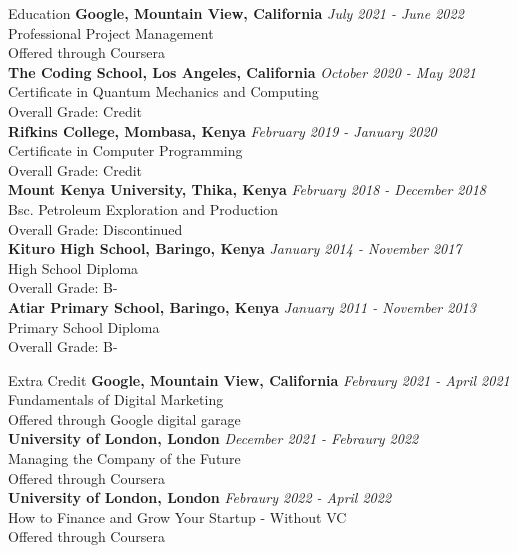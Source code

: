 \documentclass[
	11pt, %
]{resume} %
\begin{document}
\begin{rSection}{Education}
	\textbf{Google, Mountain View, California} \hfill \textit{July 2021 - June 2022} \\ 
	Professional Project Management \\
	Offered through Coursera \\
	\textbf{The Coding School, Los Angeles, California} \hfill \textit{October 2020 - May 2021} \\ 
	Certificate in Quantum Mechanics and Computing \\
	Overall Grade: Credit \\
	\textbf{Rifkins College, Mombasa, Kenya} \hfill \textit{February 2019 - January 2020} \\ 
	Certificate in Computer Programming \\
	Overall Grade: Credit \\
	\textbf{Mount Kenya University, Thika, Kenya} \hfill \textit{February 2018 - December 2018} \\ 
	Bsc. Petroleum Exploration and Production \\
	Overall Grade: Discontinued \\
	\textbf{Kituro High School, Baringo, Kenya} \hfill \textit{January 2014 - November 2017} \\ 
	High School Diploma \\
	Overall Grade: B- \\
	\textbf{Atiar Primary School, Baringo, Kenya} \hfill \textit{January 2011 - November 2013} \\ 
	Primary School Diploma \\
	Overall Grade: B-
	
\end{rSection}
\begin{rSection}{Extra Credit}
	\textbf{Google, Mountain View, California} \hfill \textit{Febraury 2021 - April 2021} \\ 
	Fundamentals of Digital Marketing \\
	Offered through Google digital garage \\
	\textbf{University of London, London} \hfill \textit{December 2021 - Febraury 2022} \\ 
	Managing the Company of the Future \\
	Offered through Coursera \\
	\textbf{University of London, London} \hfill \textit{Febraury 2022 - April 2022} \\ 
	How to Finance and Grow Your Startup - Without VC \\
	Offered through Coursera \\
\end{rSection}
\end{document}
